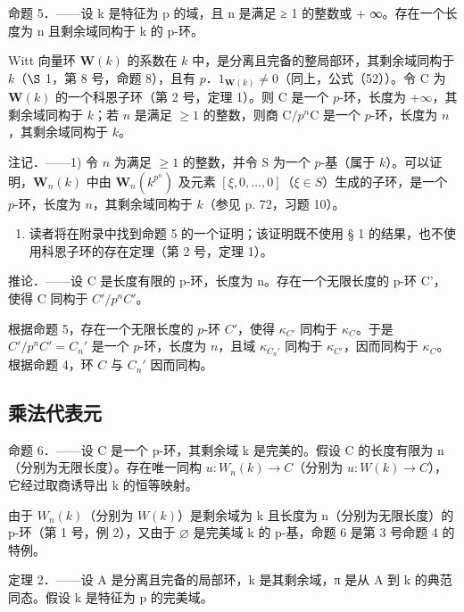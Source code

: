 命题 5．——设 k 是特征为 p 的域，且 n 是满足 ≥ 1 的整数或 + ∞。存在一个长度为 n 且剩余域同构于 k 的 p-环。

Witt 向量环 \(\mathbf{W}(k)\) 的系数在 \(k\) 中，是分离且完备的整局部环，其剩余域同构于 \(k\)（\(\S\) 1，第 8 号，命题 8），且有 \(p\)．\(1_{\mathbf{W}(k)} \neq 0\)（同上，公式（52））。令 C 为 \(\mathbf{W}(k)\) 的一个科恩子环（第 2 号，定理 1）。则 C 是一个 \(p\)-环，长度为 +\(\infty\)，其剩余域同构于 \(k\)；若 \(n\) 是满足 \(\geqslant 1\) 的整数，则商 \(\mathrm{C}/p^{n}\mathrm{C}\) 是一个 \(p\)-环，长度为 \(n\)，其剩余域同构于 \(k\)。

注记．——1) 令 \(n\) 为满足 \(\geqslant 1\) 的整数，并令 S 为一个 \(p\)-基（属于 \(k\)）。可以证明，\(\mathbf{W}_{n}(k)\) 中由 \(\mathbf{W}_{n}(k^{p^{n}})\) 及元素 \([\xi, 0, ..., 0]\)（\(\xi \in S\)）生成的子环，是一个 \(p\)-环，长度为 \(n\)，其剩余域同构于 \(k\)（参见 p. 72，习题 10）。

\begin{enumerate}
\def\labelenumi{\arabic{enumi})}
\setcounter{enumi}{1}
\tightlist
\item
  读者将在附录中找到命题 5 的一个证明；该证明既不使用 § 1 的结果，也不使用科恩子环的存在定理（第 2 号，定理 1）。
\end{enumerate}

推论．——设 C 是长度有限的 p-环，长度为 n。存在一个无限长度的 p-环 C'，使得 C 同构于 \(C'/p^{n}C'\)。

根据命题 5，存在一个无限长度的 \(p\)-环 \(C'\)，使得 \(\kappa_{C'}\) 同构于 \(\kappa_{C}\)。于是 \(C'/p^{n}C'=C_{n}'\) 是一个 \(p\)-环，长度为 \(n\)，且域 \(\kappa_{C_{n}'}\) 同构于 \(\kappa_{C'}\)，因而同构于 \(\kappa_{C}\)。根据命题 4，环 \(C\) 与 \(C_{n}'\) 因而同构。

\subsection{乘法代表元}

命题 6．——设 C 是一个 p-环，其剩余域 k 是完美的。假设 C 的长度有限为 n（分别为无限长度）。存在唯一同构 \(u:W_{n}(k)\to C\)（分别为 \(u:W(k)\to C\)），它经过取商诱导出 k 的恒等映射。

由于 \(W_{n}(k)\)（分别为 \(W(k)\)）是剩余域为 k 且长度为 n（分别为无限长度）的 p-环（第 1 号，例 2），又由于 \(\varnothing\) 是完美域 k 的 p-基，命题 6 是第 3 号命题 4 的特例。

定理 2．——设 A 是分离且完备的局部环，k 是其剩余域，π 是从 A 到 k 的典范同态。假设 k 是特征为 p 的完美域。

